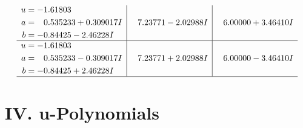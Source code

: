 \documentclass[1p]{elsarticle_modified}
\theoremstyle{definition}
\begin{document}
$$\begin{array}{c|c|c}
\begin{aligned}
u &= -1.61803\phantom{ +0.000000I} \\
a &= \phantom{-}0.535233 + 0.309017 I \\
b &= -0.84425 - 2.46228 I\end{aligned}
 & \phantom{-}7.23771 - 2.02988 I & \phantom{-}6.00000 + 3.46410 I \\ \hline\begin{aligned}
u &= -1.61803\phantom{ +0.000000I} \\
a &= \phantom{-}0.535233 - 0.309017 I \\
b &= -0.84425 + 2.46228 I\end{aligned}
 & \phantom{-}7.23771 + 2.02988 I & \phantom{-}6.00000 - 3.46410 I\\
 \hline 
 \end{array}$$\newpage
\newpage\renewcommand{\arraystretch}{1}
\centering \section*{ IV. u-Polynomials}
\end{document}

